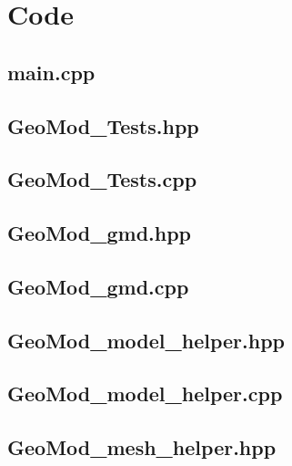 \documentclass[a4paper, 12pt]{article}
\begin{document}
\newpage
\appendix
\section{Code} \label{sec:code}

\subsection{main.cpp} \label{subsec:main_cpp}


\subsection{GeoMod\_Tests.hpp} \label{subsec:Tests_hpp}

\subsection{GeoMod\_Tests.cpp} \label{subsec:Tests_cpp}


\subsection{GeoMod\_gmd.hpp} \label{subsec:gmd_hpp}

\subsection{GeoMod\_gmd.cpp} \label{subsec:gmd_cpp}


\subsection{GeoMod\_model\_helper.hpp} \label{subsec:model_hpp}

\subsection{GeoMod\_model\_helper.cpp} \label{subsec:model_cpp}


\subsection{GeoMod\_mesh\_helper.hpp} \label{subsec:mesh_hpp}

\end{document}
